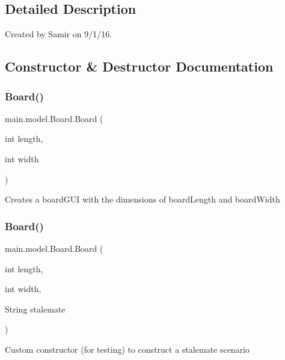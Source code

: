 \subsection{Detailed Description}
Created by Samir on 9/1/16. 

\subsection{Constructor \& Destructor Documentation}
\hypertarget{classmain_1_1model_1_1_board_aa960cea7bc44db0fdb54d18767579c52}{}\label{classmain_1_1model_1_1_board_aa960cea7bc44db0fdb54d18767579c52} 
\subsubsection{\texorpdfstring{Board()}{Board()}\hspace{0.1cm}{\footnotesize\ttfamily [1/2]}}
{\footnotesize\ttfamily main.\+model.\+Board.\+Board (\begin{DoxyParamCaption}\item[{int}]{length,  }\item[{int}]{width }\end{DoxyParamCaption})}

Creates a board\+G\+UI with the dimensions of board\+Length and board\+Width \hypertarget{classmain_1_1model_1_1_board_a96612d9907fdc7144072b39701f3c98f}{}\label{classmain_1_1model_1_1_board_a96612d9907fdc7144072b39701f3c98f} 
\subsubsection{\texorpdfstring{Board()}{Board()}\hspace{0.1cm}{\footnotesize\ttfamily [2/2]}}
{\footnotesize\ttfamily main.\+model.\+Board.\+Board (\begin{DoxyParamCaption}\item[{int}]{length,  }\item[{int}]{width,  }\item[{String}]{stalemate }\end{DoxyParamCaption})}

Custom constructor (for testing) to construct a stalemate scenario 

